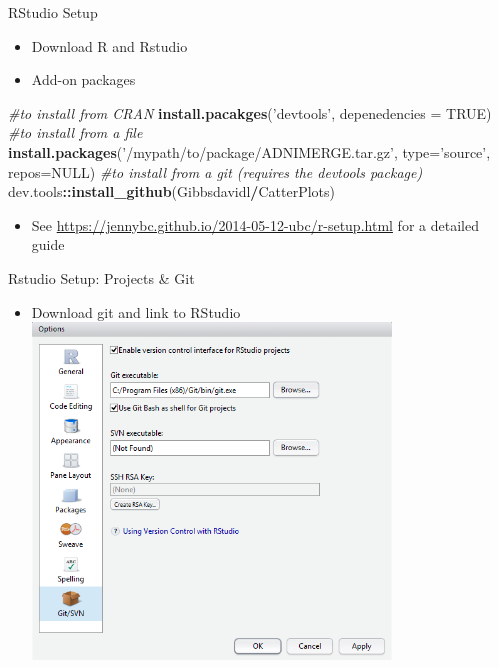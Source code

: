 \documentclass[ignorenonframetext,]{beamer}
\newenvironment{Shaded}{\begin{snugshade}}{\end{snugshade}}
\newcommand{\CommentTok}[1]{\textcolor[rgb]{0.56,0.35,0.01}{\textit{#1}}}
\newcommand{\DataTypeTok}[1]{\textcolor[rgb]{0.13,0.29,0.53}{#1}}
\newcommand{\KeywordTok}[1]{\textcolor[rgb]{0.13,0.29,0.53}{\textbf{#1}}}
\newcommand{\NormalTok}[1]{#1}
\newcommand{\OperatorTok}[1]{\textcolor[rgb]{0.81,0.36,0.00}{\textbf{#1}}}
\newcommand{\OtherTok}[1]{\textcolor[rgb]{0.56,0.35,0.01}{#1}}
\newcommand{\StringTok}[1]{\textcolor[rgb]{0.31,0.60,0.02}{#1}}
\providecommand{\tightlist}{%
  \setlength{\itemsep}{0pt}\setlength{\parskip}{0pt}}
\begin{document}
\begin{frame}[fragile]{RStudio Setup}
\protect\hypertarget{rstudio-setup}{}

\begin{itemize}
\tightlist
\item
  Download R and Rstudio
\item
  Add-on packages
\end{itemize}

\begin{Shaded}
\begin{Highlighting}[]
\CommentTok{#to install from CRAN}
\KeywordTok{install.pacakges}\NormalTok{(}\StringTok{'devtools'}\NormalTok{, }\DataTypeTok{depenedencies =} \OtherTok{TRUE}\NormalTok{)}
\CommentTok{#to install from a file}
\KeywordTok{install.packages}\NormalTok{(}\StringTok{'/mypath/to/package/ADNIMERGE.tar.gz'}\NormalTok{, }
                 \DataTypeTok{type=}\StringTok{'source'}\NormalTok{, }\DataTypeTok{repos=}\OtherTok{NULL}\NormalTok{) }
\CommentTok{#to install from a git  (requires the devtools package)}
\NormalTok{dev.tools}\OperatorTok{::}\KeywordTok{install_github}\NormalTok{(Gibbsdavidl}\OperatorTok{/}\NormalTok{CatterPlots) }
\end{Highlighting}
\end{Shaded}

\begin{itemize}
\tightlist
\item
  See \url{https://jennybc.github.io/2014-05-12-ubc/r-setup.html} for a
  detailed guide
\end{itemize}

\end{frame}

\begin{frame}{Rstudio Setup: Projects \& Git}
\protect\hypertarget{rstudio-setup-projects-git}{}

\begin{itemize}
\tightlist
\item
  Download git and link to RStudio
  \includegraphics[width=0.75\textwidth,height=\textheight]{../external/images/setup_1_rstudio_git.PNG}
\end{itemize}

\end{frame}
\end{document}
